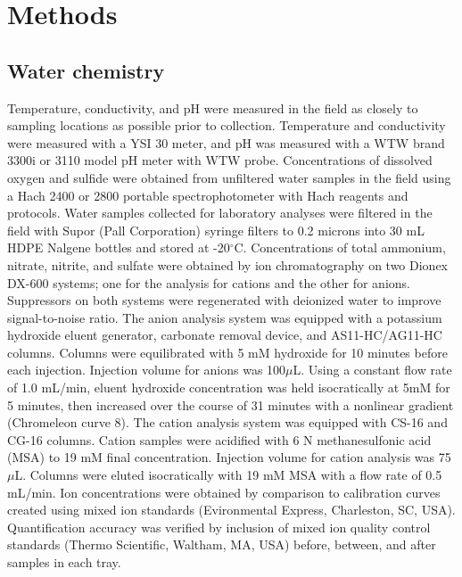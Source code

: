 
 
 




\section{Methods}
\subsection{Water chemistry} Temperature, conductivity, and pH were measured in the field as closely to sampling locations as possible prior to collection. Temperature and conductivity were measured with a YSI 30 meter, and pH was measured with a WTW brand 3300i or 3110 model pH meter with WTW probe. Concentrations of dissolved oxygen and sulfide were obtained from unfiltered water samples in the field using a Hach 2400 or 2800 portable spectrophotometer with Hach reagents and protocols. Water samples collected for laboratory analyses were filtered in the field with Supor (Pall Corporation) syringe filters to 0.2 microns into 30 mL HDPE Nalgene bottles and stored at -20$^{\circ}$C. Concentrations of total ammonium, nitrate, nitrite, and sulfate were obtained by ion chromatography on two Dionex DX-600 systems; one for the analysis for cations and the other for anions. Suppressors on both systems were regenerated with deionized water to improve signal-to-noise ratio. The anion analysis system was equipped with a potassium hydroxide eluent generator, carbonate removal device, and AS11-HC/AG11-HC columns. Columns were equilibrated with 5 mM hydroxide for 10 minutes before each injection. Injection volume for anions was 100$\mu$L. Using a constant flow rate of 1.0 mL/min, eluent hydroxide concentration was held isocratically at 5mM for 5 minutes, then increased over the course of 31 minutes with a nonlinear gradient (Chromeleon curve 8). The cation analysis system was equipped with CS-16 and CG-16 columns. Cation samples were acidified with 6 N methanesulfonic acid (MSA) to 19 mM final concentration. Injection volume for cation analysis was 75$\mu$L. Columns were eluted isocratically with 19 mM MSA with a flow rate of 0.5 mL/min. Ion concentrations were obtained by comparison to calibration curves created using mixed ion standards (Evironmental Express, Charleston, SC, USA). Quantification accuracy was verified by inclusion of mixed ion quality control standards (Thermo Scientific, Waltham, MA, USA) before, between, and after samples in each tray.

